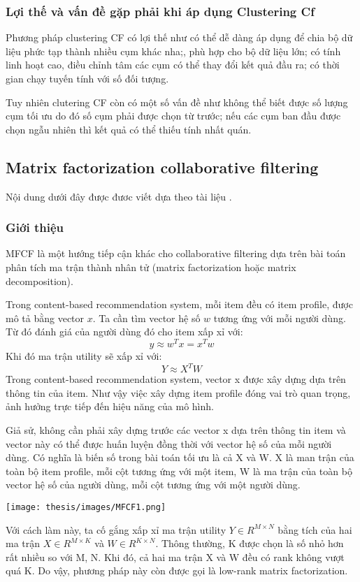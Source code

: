 \subsubsection{Lợi thế và vấn đề gặp phải khi áp dụng Clustering Cf}
Phương pháp clustering CF có lợi thế như có thể dễ dàng áp dụng để chia bộ dữ liệu phức tạp thành nhiều cụm khác nha;, phù hợp cho bộ dữ liệu lớn; có tính linh hoạt cao, điều chỉnh tâm các cụm có thể thay đổi kết quả đầu ra; có thời gian chạy tuyến tính với số đối tượng.

Tuy nhiên clutering CF còn có một số vấn đề như không thể biết được số lượng cụm tối ưu do đó số cụm phải được chọn từ trước; nếu các cụm ban đầu được chọn ngẫu nhiên thì kết quả có thể thiếu tính nhất quán.

\subsection{Matrix factorization collaborative filtering}
\noindent Nội dung dưới đây được đươc viết dựa theo tài liệu \cite{machinelearningbasic}.
\subsubsection{Giới thiệu}
\gls{MFCF} là một hướng tiếp cận khác cho collaborative filtering dựa trên bài toán phân tích ma trận thành nhân tử (matrix factorization hoặc matrix decomposition). 

Trong content-based recommendation system, mỗi item đều có item profile, được mô tả bằng vector $x$. Ta cần tìm vector hệ số $w$ tương ứng với mỗi người dùng. Từ đó đánh giá của người dùng đó cho item xấp xỉ với:
$$ y \approx w^T x = x^T w $$
Khi đó ma trận utility sẽ xấp xỉ với:
$$ Y \approx X^T W $$
Trong content-based recommendation system, vector x được xây dựng dựa trên thông tin của item. Như vậy việc xây dựng item profile đóng vai trò quan trọng, ảnh hưởng trực tiếp đến hiệu năng của mô hình.

Giả sử, không cần phải xây dựng trước các vector x dựa trên thông tin item và vector này có thể được huấn luyện đồng thời với vector hệ số của mỗi người dùng. Có nghĩa là biến số trong bài toán tối ưu là cả X và W. X là man trận của toàn bộ item profile, mỗi cột tương ứng với một item, W là ma trận của toàn bộ vector hệ số của người dùng, mỗi cột tương ứng với một người dùng.

\texttt{[image: thesis/images/MFCF1.png]}

Với cách làm này, ta cố gắng xấp xỉ ma trận utility $Y \in R^{M \times N}$ bằng tích của hai ma trận $ X \in R^{M \times K} $ và $ W \in R^{K \times N} $. Thông thường, K được chọn là số nhỏ hơn rất nhiều so với M, N. Khi đó, cả hai ma trận X và W đều có rank không vượt quá K. Do vậy, phương pháp này còn được gọi là low-rank matrix factorization. 

